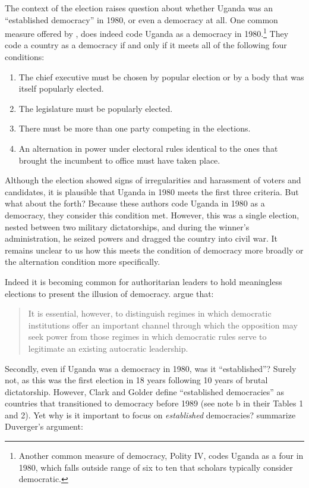 \documentclass[12pt]{article}
\begin{document}
The context of the election raises question about whether Uganda was an ``established democracy'' in 1980, or even a democracy at all. 
One common measure offered by \cite{CheibubGandhiVreeland2010}, does indeed code Uganda as a democracy in 1980.\footnote{Another common measure of democracy, Polity IV, codes Uganda as a four in 1980, which falls outside range of six to ten that scholars typically consider democratic.} 
They code a country as a democracy if and only if it meets all of the following four conditions:
\begin{enumerate}
\item The chief executive must be chosen by popular election or by a body that was itself popularly elected.
\item The legislature must be popularly elected.
\item There must be more than one party competing in the elections.
\item An alternation in power under electoral rules identical to the ones that brought the incumbent to office must have taken place.
\end{enumerate}

Although the election showed signs of irregularities and harassment of voters and candidates, it is plausible that Uganda in 1980 meets the first three criteria. 
But what about the forth? 
Because these authors code Uganda in 1980 as a democracy, they consider this condition met. 
However, this was a single election, nested between two military dictatorships, and during the winner's administration, he seized powers and dragged the country into civil war. 
It remains unclear to us how this meets the condition of democracy more broadly or the alternation condition more specifically.

Indeed it is becoming common for authoritarian leaders to hold meaningless elections to present the illusion of democracy. \cite{LevitskyWay2002} argue that:
\begin{quote}
It is essential, however, to distinguish regimes in which democratic institutions offer an important channel through which the opposition may seek power from those regimes in which democratic rules serve to legitimate an existing autocratic leadership.
\end{quote}

Secondly, even if Uganda was a democracy in 1980, was it ``established''? 
Surely not, as this was the first election in 18 years following 10 years of brutal dictatorship. 
However, Clark and Golder define ``established democracies'' as countries that transitioned to democracy before 1989 (see note b in their Tables 1 and 2). 
Yet why is it important to focus on \textit{established} democracies? \citet[p. 706]{ClarkGolder2006} summarize Duverger's argument: 
\end{document}
